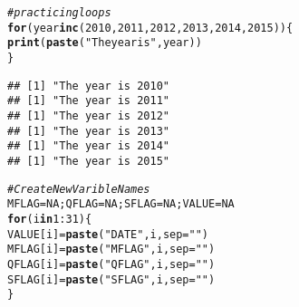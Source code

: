 \documentclass{article}\usepackage[]{graphicx}\usepackage[]{color}
\makeatletter
\newcommand{\hlnum}[1]{\textcolor[rgb]{0.686,0.059,0.569}{#1}}%
\newcommand{\hlstr}[1]{\textcolor[rgb]{0.192,0.494,0.8}{#1}}%
\newcommand{\hlcom}[1]{\textcolor[rgb]{0.678,0.584,0.686}{\textit{#1}}}%
\newcommand{\hlopt}[1]{\textcolor[rgb]{0,0,0}{#1}}%
\newcommand{\hlstd}[1]{\textcolor[rgb]{0.345,0.345,0.345}{#1}}%
\newcommand{\hlkwa}[1]{\textcolor[rgb]{0.161,0.373,0.58}{\textbf{#1}}}%
\newcommand{\hlkwb}[1]{\textcolor[rgb]{0.69,0.353,0.396}{#1}}%
\newcommand{\hlkwc}[1]{\textcolor[rgb]{0.333,0.667,0.333}{#1}}%
\newcommand{\hlkwd}[1]{\textcolor[rgb]{0.737,0.353,0.396}{\textbf{#1}}}%
\newenvironment{kframe}{%
 \def\at@end@of@kframe{}%
 \ifinner\ifhmode%
  \def\at@end@of@kframe{\end{minipage}}%
  \begin{minipage}{\columnwidth}%
 \fi\fi%
 \def\FrameCommand##1{\hskip\@totalleftmargin \hskip-\fboxsep
 \colorbox{shadecolor}{##1}\hskip-\fboxsep
     \hskip-\linewidth \hskip-\@totalleftmargin \hskip\columnwidth}%
 \MakeFramed {\advance\hsize-\width
   \@totalleftmargin\z@ \linewidth\hsize
   \@setminipage}}%
 {\par\unskip\endMakeFramed%
 \at@end@of@kframe}
\newenvironment{knitrout}{}{} %
\makeatother
\begin{document}
\begin{knitrout}
\color{fgcolor}\begin{kframe}
\begin{alltt}
\hlcom{# practicing loops}
\hlkwa{for} \hlstd{(year} \hlkwa{in} \hlkwd{c}\hlstd{(}\hlnum{2010}\hlstd{,}\hlnum{2011}\hlstd{,}\hlnum{2012}\hlstd{,}\hlnum{2013}\hlstd{,}\hlnum{2014}\hlstd{,}\hlnum{2015}\hlstd{))\{}
  \hlkwd{print}\hlstd{(}\hlkwd{paste}\hlstd{(}\hlstr{"The year is"}\hlstd{, year))}
\hlstd{\}}
\end{alltt}
\begin{verbatim}
## [1] "The year is 2010"
## [1] "The year is 2011"
## [1] "The year is 2012"
## [1] "The year is 2013"
## [1] "The year is 2014"
## [1] "The year is 2015"
\end{verbatim}
\begin{alltt}
\hlcom{# Create New Varible Names}
\hlstd{MFLAG}\hlkwb{=}\hlnum{NA}\hlstd{; QFLAG}\hlkwb{=}\hlnum{NA}\hlstd{; SFLAG}\hlkwb{=}\hlnum{NA}\hlstd{; VALUE}\hlkwb{=}\hlnum{NA}
\hlkwa{for} \hlstd{(i} \hlkwa{in} \hlnum{1}\hlopt{:}\hlnum{31}\hlstd{)\{}
\hlstd{VALUE[i]} \hlkwb{=} \hlkwd{paste}\hlstd{(}\hlstr{"DATE"}\hlstd{, i,} \hlkwc{sep}\hlstd{=}\hlstr{""}\hlstd{)}
\hlstd{MFLAG[i]} \hlkwb{=} \hlkwd{paste}\hlstd{(}\hlstr{"MFLAG"}\hlstd{, i,} \hlkwc{sep}\hlstd{=}\hlstr{""}\hlstd{)}
\hlstd{QFLAG[i]} \hlkwb{=} \hlkwd{paste}\hlstd{(}\hlstr{"QFLAG"}\hlstd{, i,} \hlkwc{sep}\hlstd{=}\hlstr{""}\hlstd{)}
\hlstd{SFLAG[i]} \hlkwb{=} \hlkwd{paste}\hlstd{(}\hlstr{"SFLAG"}\hlstd{, i,} \hlkwc{sep}\hlstd{=}\hlstr{""}\hlstd{)}
\hlstd{\}}


\end{alltt}
\end{kframe}
\end{knitrout}
\end{document}
